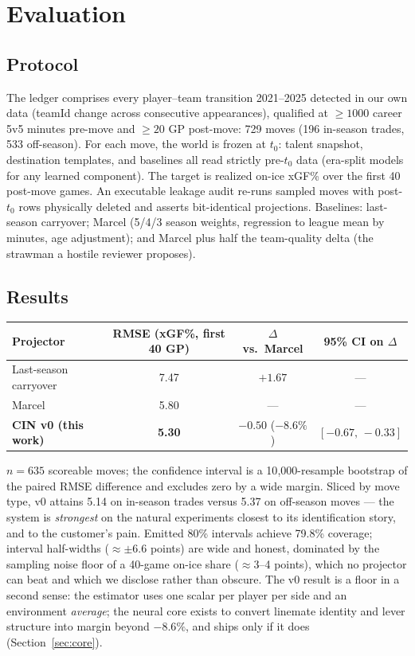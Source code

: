 \documentclass[11pt]{article}
\begin{document}
\section{Evaluation}\label{sec:eval}

\subsection{Protocol}

The ledger comprises every player--team transition 2021--2025 detected in our own data
(teamId change across consecutive appearances), qualified at $\ge 1000$ career 5v5 minutes
pre-move and $\ge 20$ GP post-move: 729 moves (196 in-season trades, 533 off-season).
For each move, the world is frozen at $t_0$: talent snapshot, destination templates, and
baselines all read strictly pre-$t_0$ data (era-split models for any learned component).
The target is realized on-ice xGF\% over the first 40 post-move games. An executable
leakage audit re-runs sampled moves with post-$t_0$ rows physically deleted and asserts
bit-identical projections. Baselines: last-season carryover; Marcel (5/4/3 season weights,
regression to league mean by minutes, age adjustment); and Marcel plus half the
team-quality delta (the strawman a hostile reviewer proposes).

\subsection{Results}

\begin{center}
\begin{tabular}{@{}lccc@{}}
\toprule
Projector & RMSE (xGF\%, first 40 GP) & $\Delta$ vs.\ Marcel & 95\% CI on $\Delta$ \\
\midrule
Last-season carryover & 7.47 & $+1.67$ & --- \\
Marcel & 5.80 & --- & --- \\
\textbf{CIN v0 (this work)} & \textbf{5.30} & $\mathbf{-0.50}$ ($-8.6\%$) & $[-0.67,\, -0.33]$ \\
\bottomrule
\end{tabular}
\end{center}

\noindent $n = 635$ scoreable moves; the confidence interval is a 10{,}000-resample
bootstrap of the paired RMSE difference and excludes zero by a wide margin. Sliced by move
type, v0 attains 5.14 on in-season trades versus 5.37 on off-season moves --- the system is
\emph{strongest} on the natural experiments closest to its identification story, and to the
customer's pain. Emitted 80\% intervals achieve 79.8\% coverage; interval half-widths
($\approx \pm 6.6$ points) are wide and honest, dominated by the sampling noise floor of a
40-game on-ice share ($\approx$3--4 points), which no projector can beat and which we
disclose rather than obscure. The v0 result is a floor in a second sense: the estimator
uses one scalar per player per side and an environment \emph{average}; the neural core
exists to convert linemate identity and lever structure into margin beyond $-8.6\%$, and
ships only if it does (Section~\ref{sec:core}).
\end{document}
